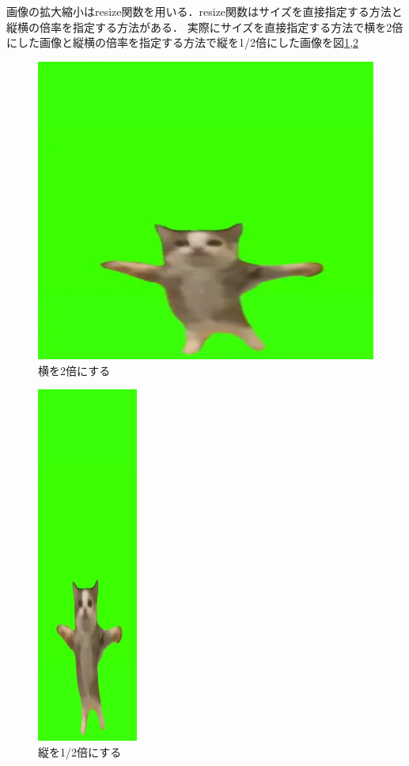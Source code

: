\documentclass[color,subfigure,epsf,here,cite,otf,comment,nccmath,mediabb,fancyhdr,12pt]{ltjsarticle}
\begin{document}
    画像の拡大縮小はresize関数を用いる．resize関数はサイズを直接指定する方法と縦横の倍率を指定する方法がある．
    実際にサイズを直接指定する方法で横を2倍にした画像と縦横の倍率を指定する方法で縦を1/2倍にした画像を図\ref{fig:large1},\ref{fig:large2}
    \begin{figure}[H]
        \begin{center}
        \includegraphics[width=0.22\columnwidth]{image/result1.png}
        \caption{横を2倍にする}
        \label{fig:large1}
        \end{center}
    \end{figure}
    \begin{figure}[H]
        \begin{center}
        \includegraphics[width=0.22\columnwidth]{image/result2.png}
        \caption{縦を1/2倍にする} %
        \label{fig:large2}
        \end{center}
    \end{figure}
\end{document}
